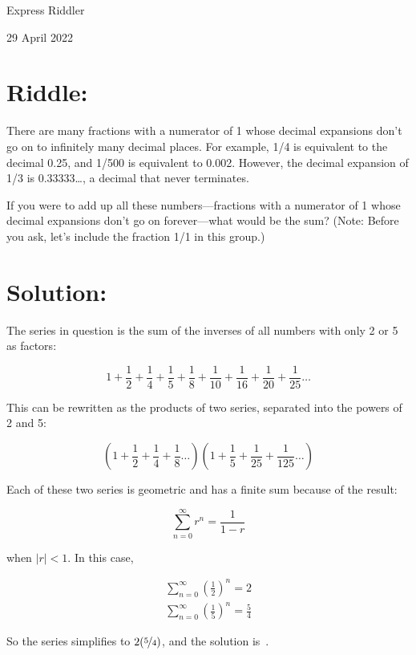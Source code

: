 \documentclass{article}
\begin{document}
\pagestyle{empty} %

\begin{center}
{\LARGE Express Riddler}

\vspace{0.15in}

{\Large 29 April 2022}
\end{center}


\section*{Riddle:}

There are many fractions with a numerator of 1 whose decimal expansions don't go on to infinitely many decimal places.
For example, 1/4 is equivalent to the decimal 0.25, and 1/500 is equivalent to 0.002.
However, the decimal expansion of 1/3 is 0.33333\dots, a decimal that never terminates.

If you were to add up all these numbers---fractions with a numerator of 1 whose decimal expansions don't go on forever---what would be the sum?
(Note: Before you ask, let's include the fraction 1/1 in this group.)


\section*{Solution:}

The series in question is the sum of the inverses of all numbers with only 2 or 5 as factors:

\[
1+\frac{1}{2}+\frac{1}{4}+\frac{1}{5}+\frac{1}{8}+\frac{1}{10}+\frac{1}{16}+\frac{1}{20}+\frac{1}{25}\dots
\]

This can be rewritten as the products of two series, separated into the powers of 2 and 5:

\[
\left(1+\frac{1}{2}+\frac{1}{4}+\frac{1}{8}\dots\right)
\left(1+\frac{1}{5}+\frac{1}{25}+\frac{1}{125}\dots\right)
\]

Each of these two series is geometric and has a finite sum because of the result:

\[
\sum_{n=0}^{\infty}r^{n}=\frac{1}{1-r}
\]

when $|r|<1$.
In this case,

\begin{align*}
\sum_{n=0}^{\infty}\left(\frac{1}{2}\right)^{n}=2 \\
\sum_{n=0}^{\infty}\left(\frac{1}{5}\right)^{n}=\frac{5}{4}
\end{align*}

So the series simplifies to $2(\nicefrac{5}{4})$, and the solution is \,.
\end{document}
